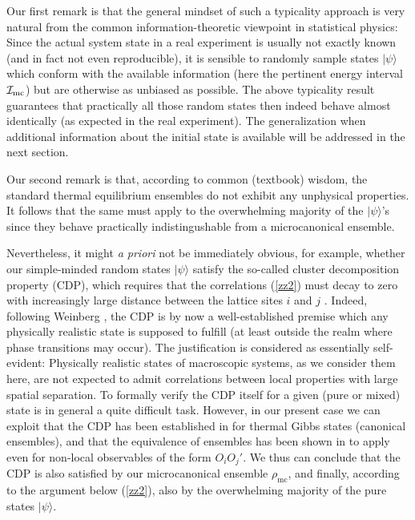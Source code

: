 \documentclass[twocolumn,aps,prb,floatfix,superscriptaddress]{revtex4-2}
\newcommand{\<}{\left\langle}	%
\renewcommand{\>}{\right\rangle}	%
\newcommand{\Imc}{{\cal I}_{\mathrm{mc}}}
\newcommand{\rhomic}{\rho_{\mathrm{mc}}}
\begin{document}
Our first remark is that the general mindset of such a 
typicality approach is very natural
from the common information-theoretic 
viewpoint in statistical physics:
Since the actual system state in a real experiment
is usually not exactly known (and in fact not even reproducible),
it is sensible to randomly
sample states $|\psi\rangle$ which conform with the available 
information (here the pertinent energy interval $\Imc$) 
but are otherwise as unbiased as possible.
The above typicality result guarantees that practically 
all those random states then indeed behave 
almost identically (as expected in the real experiment).
The generalization when additional information about 
the initial state is available will be addressed in the 
next section.

Our second remark is that, according to common (textbook) 
wisdom, the standard thermal equilibrium ensembles 
do not
exhibit any unphysical properties.
It follows that the same must apply to the overwhelming
majority of the $|\psi\rangle$'s since they behave practically
indistingushable from a microcanonical ensemble.

Nevertheless,
it might {\em a priori} not
be 
immediately obvious, for example, whether
our simple-minded random states $|\psi\rangle$ 
satisfy the so-called cluster decomposition 
property (CDP), 
which requires
that the correlations (\ref{zz2}) 
must decay to zero with increasingly large distance 
between the lattice sites $i$ and $j$ 
\cite{rig08,mul15,ess16,far17,doy17,sot14,mur19,glu19}.
Indeed, following Weinberg  \cite{wei97}, the CDP is by 
now a well-established 
premise
which any physically
realistic state is supposed to fulfill (at least outside 
the realm where phase transitions may occur).
The justification is considered as essentially self-evident:
Physically realistic states of macroscopic systems, 
as we consider them here, are not expected to
admit correlations between local properties
with large spatial separation.
To formally verify the CDP itself
for a given (pure or mixed) state is in general a 
quite difficult task.
However,
in our present case we can 
exploit that the CDP has been established 
in \cite{ara69,par82,par95,kli14,fro15} 
for thermal Gibbs states (canonical ensembles),
and that the equivalence of ensembles 
has been shown in \cite{tas18} to apply even for 
non-local observables of the form $O_iO_j'$.
We thus can conclude that the CDP 
is also satisfied by our microcanonical 
ensemble $\rhomic$, and finally, according to the 
argument below (\ref{zz2}), also by the overwhelming majority 
of the pure states $|\psi\rangle$.
\end{document}
